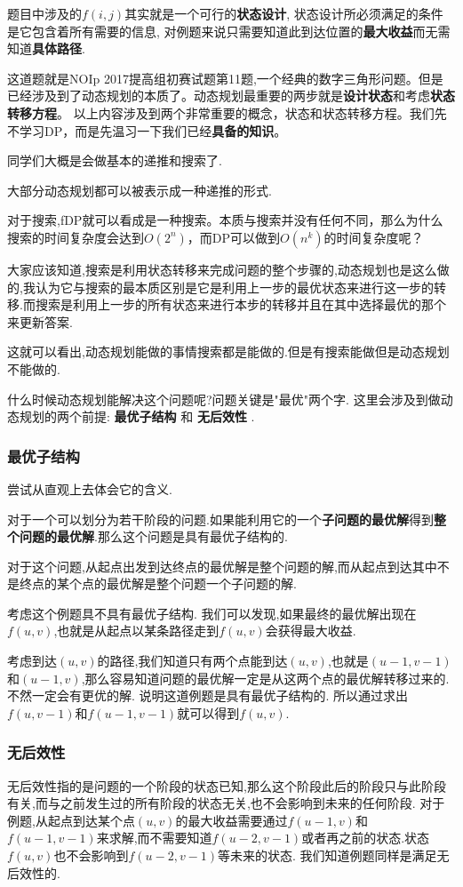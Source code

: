 题目中涉及的$f(i,j)$其实就是一个可行的\textbf{状态设计}, 状态设计所必须满足的条件是它包含着所有需要的信息, 对例题来说只需要知道此到达位置的\textbf{最大收益}而无需知道\textbf{具体路径}.

这道题就是NOIp 2017提高组初赛试题第11题,一个经典的数字三角形问题。但是已经涉及到了动态规划的本质了。动态规划最重要的两步就是\textbf{设计状态}和考虑\textbf{状态转移方程}。
以上内容涉及到两个非常重要的概念，状态和状态转移方程。我们先不学习DP，而是先温习一下我们已经\textbf{具备的知识}。

同学们大概是会做基本的递推和搜索了.

大部分动态规划都可以被表示成一种递推的形式.

对于搜索,fDP就可以看成是一种搜索。本质与搜索并没有任何不同，那么为什么搜索的时间复杂度会达到$O(2^n)$，而DP可以做到$O(n^k)$的时间复杂度呢？

大家应该知道,搜索是利用状态转移来完成问题的整个步骤的,动态规划也是这么做的,我认为它与搜索的最本质区别是它是利用上一步的最优状态来进行这一步的转移.而搜索是利用上一步的所有状态来进行本步的转移并且在其中选择最优的那个来更新答案.

这就可以看出,动态规划能做的事情搜索都是能做的.但是有搜索能做但是动态规划不能做的.

什么时候动态规划能解决这个问题呢?问题关键是"最优"两个字.
这里会涉及到做动态规划的两个前提: \textbf{最优子结构} 和 \textbf{无后效性} .


\subsubsection{最优子结构}尝试从直观上去体会它的含义.

对于一个可以划分为若干阶段的问题.如果能利用它的一个\textbf{子问题的最优解}得到\textbf{整个问题的最优解}.那么这个问题是具有最优子结构的.

对于这个问题,从起点出发到达终点的最优解是整个问题的解,而从起点到达其中不是终点的某个点的最优解是整个问题一个子问题的解.

考虑这个例题具不具有最优子结构.
我们可以发现,如果最终的最优解出现在$f(u,v)$,也就是从起点以某条路径走到$f(u,v)$会获得最大收益.

考虑到达$(u,v)$的路径,我们知道只有两个点能到达$(u,v)$,也就是$(u-1,v-1)$和$(u-1,v)$,那么容易知道问题的最优解一定是从这两个点的最优解转移过来的.不然一定会有更优的解.
说明这道例题是具有最优子结构的.
所以通过求出$f(u,v-1)$和$f(u-1,v-1)$就可以得到$f(u,v)$.




\subsubsection{无后效性}
无后效性指的是问题的一个阶段的状态已知,那么这个阶段此后的阶段只与此阶段有关,而与之前发生过的所有阶段的状态无关,也不会影响到未来的任何阶段.
对于例题,从起点到达某个点$(u,v)$的最大收益需要通过$f(u-1,v)$和$f(u-1,v-1)$来求解,而不需要知道$f(u-2,v-1)$或者再之前的状态.状态$f(u,v)$也不会影响到$f(u-2,v-1)$等未来的状态.
我们知道例题同样是满足无后效性的.

